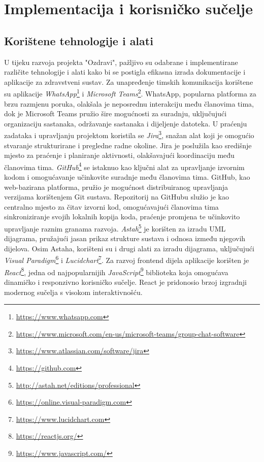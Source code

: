 \chapter{Implementacija i korisničko sučelje}
		\section{Korištene tehnologije i alati}		
			 U tijeku razvoja projekta "Ozdravi", pažljivo su odabrane i implementirane različite tehnologije i alati kako bi se postigla efikasna izrada dokumentacije i aplikacije za zdravstveni sustav.
			 Za unapređenje timskih komunikacija korištene su aplikacije \textit{WhatsApp}\footnote{\url{https://www.whatsapp.com}} i \textit{Microsoft Teams}\footnote{\url{https://www.microsoft.com/en-us/microsoft-teams/group-chat-software}}. WhatsApp, popularna platforma za brzu razmjenu poruka, olakšala je neposrednu interakciju među članovima tima, dok je Microsoft Teams pružio šire mogućnosti za suradnju, uključujući organizaciju sastanaka, održavanje sastanaka i dijeljenje datoteka.
			 U praćenju zadataka i upravljanju projektom koristila se \textit{Jira}\footnote{\url{https://www.atlassian.com/software/jira}}, snažan alat koji je omogućio stvaranje strukturirane i pregledne radne okoline. Jira je poslužila kao središnje mjesto za praćenje i planiranje aktivnosti, olakšavajući koordinaciju među članovima tima.
			 \textit{GitHub}\footnote{\url{https://github.com}} se istaknuo kao ključni alat za upravljanje izvornim kodom i omogućavanje učinkovite suradnje među članovima tima. GitHub, kao web-bazirana platforma, pružio je mogućnost distribuiranog upravljanja verzijama korištenjem Git sustava. Repozitorij na GitHubu služio je kao centralno mjesto za čitav izvorni kod, omogućavajući članovima tima sinkroniziranje svojih lokalnih kopija koda, praćenje promjena te učinkovito upravljanje raznim granama razvoja.
			 \textit{Astah}\footnote{\url{http://astah.net/editions/professional}} je korišten za izradu UML dijagrama, pružajući jasan prikaz strukture sustava i odnosa između njegovih dijelova. Osim Astaha, korišteni su i drugi alati za izradu dijagrama, uključujući \textit{Visual Paradigm}\footnote{\url{https://online.visual-paradigm.com}} i \textit{Lucidchart}\footnote{\url{https://www.lucidchart.com}}.
			 Za razvoj frontend dijela aplikacije korišten je \textit{React}\footnote{\url{https://reactjs.org/}}, jedna od najpopularnijih \textit{JavaScript}\footnote{\url{https://www.javascript.com/}} biblioteka koja omogućava dinamičko i responzivno korisničko sučelje. React je pridonosio brzoj izgradnji modernog sučelja s visokom interaktivnošću.
